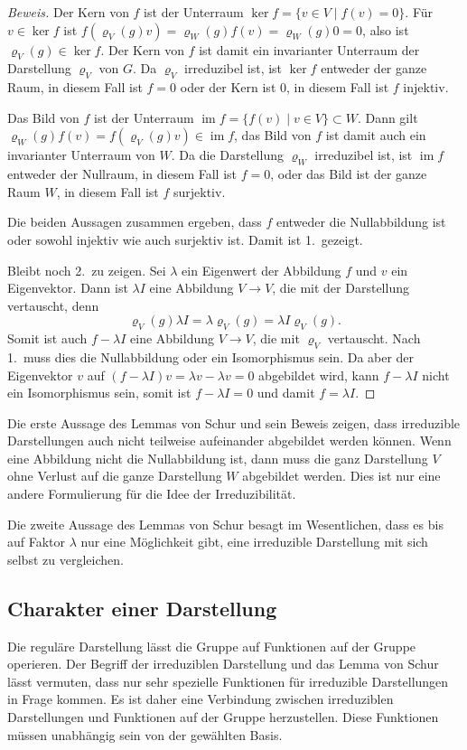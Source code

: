 \begin{proof}[Beweis]
Der Kern von $f$ ist der Unterraum
$\operatorname{ker}f = \{v\in V\mid f(v)=0\}$.
Für $v\in\operatorname{ker}f$ ist
$f(\varrho_V(g)v) = \varrho_W(g) f(v) = \varrho_W(g) 0=0$, also ist
$\varrho_V(g)\in\operatorname{ker}f$.
Der Kern von $f$ ist damit ein invarianter Unterraum der Darstellung
$\varrho_V$ von $G$.
Da $\varrho_V$ irreduzibel ist, ist $\operatorname{ker}f$ entweder
der ganze Raum, in diesem Fall ist $f=0$ oder der Kern ist $0$, in diesem
Fall ist $f$ injektiv.

Das Bild von $f$ ist der Unterraum
$\operatorname{im}f = \{f(v)\mid v\in V\}\subset W$.
Dann gilt
$\varrho_W(g)f(v) = f(\varrho_V(g)v)\in\operatorname{im}f$, das Bild von
$f$ ist damit auch ein invarianter Unterraum von $W$.
Da die Darstellung $\varrho_W$  irreduzibel ist, ist $\operatorname{im}f$
entweder der Nullraum, in diesem Fall ist $f=0$, oder das Bild ist der
ganze Raum $W$, in diesem Fall ist $f$ surjektiv.

Die beiden Aussagen zusammen ergeben, dass $f$ entweder die Nullabbildung
ist oder sowohl injektiv wie auch surjektiv ist.
Damit ist 1.~gezeigt.

Bleibt noch 2.~zu zeigen.
Sei $\lambda$ ein Eigenwert der Abbildung $f$ und $v$ ein Eigenvektor.
Dann ist $\lambda I$ eine
Abbildung $V\to V$, die mit der Darstellung vertauscht, denn
\[
\varrho_V(g)\lambda I =
\lambda \varrho_V(g) = \lambda I\varrho_V(g).
\]
Somit ist auch $f-\lambda I$ eine Abbildung $V\to V$, die mit $\varrho_V$
vertauscht.
Nach 1.~muss dies die Nullabbildung oder ein Isomorphismus sein.
Da aber der Eigenvektor $v$ auf $(f-\lambda I)v = \lambda v - \lambda v = 0$
abgebildet wird, kann $f-\lambda I$ nicht ein Isomorphismus sein, somit
ist $f-\lambda I=0$ und damit $f=\lambda I$.
\end{proof}

Die erste Aussage des Lemmas von Schur und sein Beweis zeigen, dass
irreduzible Darstellungen auch nicht teilweise aufeinander abgebildet
werden können.
Wenn eine Abbildung nicht die Nullabbildung ist, dann muss die
ganz Darstellung $V$ ohne Verlust auf die ganze Darstellung $W$
abgebildet werden.
Dies ist nur eine andere Formulierung für die Idee der Irreduzibilität.

Die zweite Aussage des Lemmas von Schur besagt im Wesentlichen, dass
es bis auf Faktor $\lambda$ nur eine Möglichkeit gibt, eine irreduzible
Darstellung mit sich selbst zu vergleichen.

%
%
\subsection{Charakter einer Darstellung}
Die reguläre Darstellung lässt die Gruppe auf Funktionen auf der
Gruppe operieren.
Der Begriff der irreduziblen Darstellung und das Lemma von Schur
lässt vermuten, dass nur sehr spezielle Funktionen für irreduzible
Darstellungen in Frage kommen.
Es ist daher eine Verbindung zwischen irreduziblen Darstellungen
und Funktionen auf der Gruppe herzustellen.
Diese Funktionen müssen unabhängig sein von der gewählten Basis.

